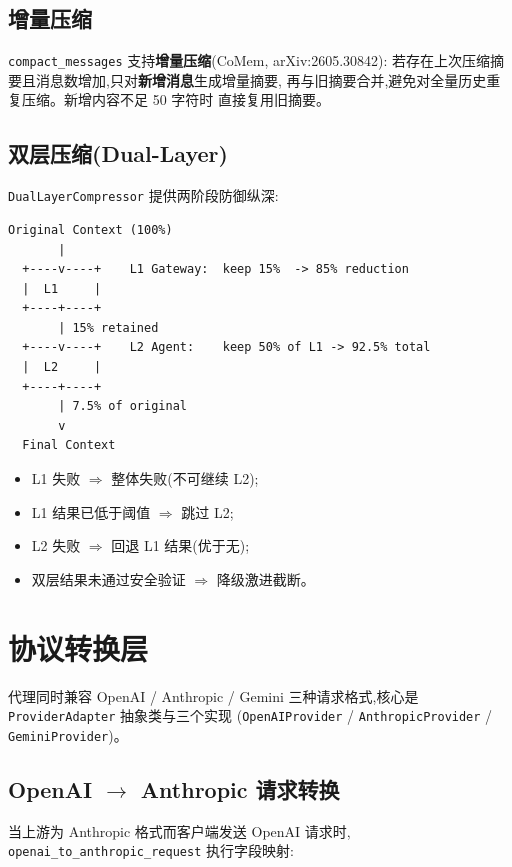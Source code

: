 \documentclass[11pt,a4paper]{article}
\begin{document}
\subsection{增量压缩}

\texttt{compact\_messages} 支持\textbf{增量压缩}(CoMem, arXiv:2605.30842):
若存在上次压缩摘要且消息数增加,只对\textbf{新增消息}生成增量摘要,
再与旧摘要合并,避免对全量历史重复压缩。新增内容不足 50 字符时
直接复用旧摘要。

\subsection{双层压缩(Dual-Layer)}

\texttt{DualLayerCompressor} 提供两阶段防御纵深:

\begin{verbatim}
Original Context (100%)
       |
  +----v----+    L1 Gateway:  keep 15%  -> 85% reduction
  |  L1     |
  +----+----+
       | 15% retained
  +----v----+    L2 Agent:    keep 50% of L1 -> 92.5% total
  |  L2     |
  +----+----+
       | 7.5% of original
       v
  Final Context
\end{verbatim}

\begin{itemize}
  \item L1 失败 $\Rightarrow$ 整体失败(不可继续 L2);
  \item L1 结果已低于阈值 $\Rightarrow$ 跳过 L2;
  \item L2 失败 $\Rightarrow$ 回退 L1 结果(优于无);
  \item 双层结果未通过安全验证 $\Rightarrow$ 降级激进截断。
\end{itemize}

\section{协议转换层}

代理同时兼容 OpenAI / Anthropic / Gemini 三种请求格式,核心是
\texttt{ProviderAdapter} 抽象类与三个实现
(\texttt{OpenAIProvider} / \texttt{AnthropicProvider} / \texttt{GeminiProvider})。

\subsection{OpenAI $\rightarrow$ Anthropic 请求转换}

当上游为 Anthropic 格式而客户端发送 OpenAI 请求时,
\texttt{openai\_to\_anthropic\_request} 执行字段映射:
\end{document}
